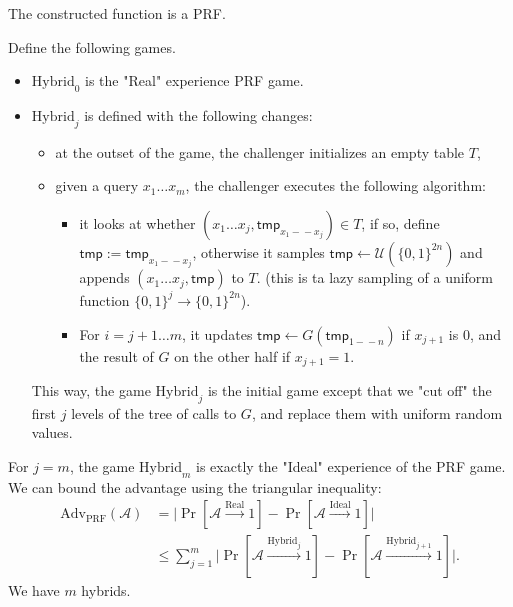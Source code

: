 \documentclass[./main]{subfiles}
\begin{document}
  \begin{lem}
    The constructed function is a PRF.
  \end{lem}
  \begin{prv}
    Define the following games.
    \begin{itemize}
      \item $\mathrm{Hybrid}_0$ is the "Real" experience PRF game.
      \item $\mathrm{Hybrid}_j$ is defined with the following changes:
        \begin{itemize}
          \item at the outset of the game, the challenger initializes an empty table $T$,
          \item given a query $x_1 \ldots x_m$, the challenger executes the following algorithm:
            \begin{itemize}
              \item it looks at whether $(x_1 \ldots x_j , \mathsf{tmp}_{x_1 -\!\!- x_j}) \in T$, if so, define $\mathsf{tmp} := \mathsf{tmp}_{x_1 -\!\!-x_j}$, otherwise it samples $\mathsf{tmp} \gets \mathcal{U}(\{0,1\}^{2n})$ and appends $(x_1\ldots x_j, \mathsf{tmp})$ to $T$.
                (this is ta lazy sampling of a uniform function $\{0,1\}^j \to \{0,1\}^{2n}$).
              \item For $i = j + 1\ldots m$, it updates $\mathsf{tmp} \gets G(\mathsf{tmp}_{1 -\!\!- n})$ if $x_{j+1} $ is $0$, and the result of $G$ on the other half if $x_{j+1} = 1$.
            \end{itemize}
        \end{itemize}
        This way, the game $\mathrm{Hybrid}_j$ is the initial game except that we "cut off" the first $j$ levels of the tree of calls to $G$, and replace them with uniform random values.
    \end{itemize}
    For $j = m$, the game $\mathrm{Hybrid}_m$ is exactly the "Ideal" experience of the PRF game.
    We can bound the advantage using the triangular inequality:
    \begin{align*}
    \mathrm{Adv}_\mathrm{PRF}(\mathcal{A})
    &= \big| \Pr[\mathcal{A} \xrightarrow{\text{Real}} 1] - \Pr[\mathcal{A} \xrightarrow{\text{Ideal}} 1] \big| \\
    &\le \sum_{j=1}^m \big| \Pr[\mathcal{A} \xrightarrow{\mathrm{Hybrid}_j} 1] - \Pr[\mathcal{A} \xrightarrow{\mathrm{Hybrid}_{j+1}} 1] \big|
    .\end{align*}
    We have $m$ hybrids.



\end{prv}
\end{document}
